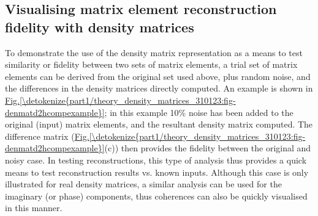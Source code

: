 \documentclass[letterpaper,table,10pt,english]{jupyterBook}
\begin{document}
\subsection{Visualising matrix element reconstruction fidelity with density matrices}
\label{\detokenize{part1/theory_density_matrices_310123:visualising-matrix-element-reconstruction-fidelity-with-density-matrices}}
\sphinxAtStartPar
To demonstrate the use of the density matrix representation as a means to test similarity or fidelity between two sets of matrix elements, a trial set of matrix elements can be derived from the original set used above, plus random noise, and the differences in the density matrices directly computed. An example is shown in \hyperref[\detokenize{part1/theory_density_matrices_310123:fig-denmatd2hcompexample}]{Fig.\@ \ref{\detokenize{part1/theory_density_matrices_310123:fig-denmatd2hcompexample}}}; in this example 10\% noise has been added to the original (input) matrix elements, and the resultant density matrix computed. The difference matrix (\hyperref[\detokenize{part1/theory_density_matrices_310123:fig-denmatd2hcompexample}]{Fig.\@ \ref{\detokenize{part1/theory_density_matrices_310123:fig-denmatd2hcompexample}}}(c)) then provides the fidelity between the original and noisy case. In testing reconstructions, this type of analysis thus provides a quick means to test reconstruction results vs. known inputs. Although this case is only illustrated for real density matrices, a similar analysis can be used for the imaginary (or phase) components, thus coherences can also be quickly visualised in this manner.
\end{document}
